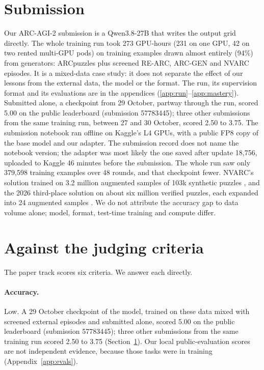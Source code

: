 \documentclass[11pt]{article}
\begin{document}
\section{Submission}
\label{sec:submission}

Our ARC-AGI-2 submission is a Qwen3.8-27B that writes the output grid directly.
The whole training run took 273 GPU-hours (231 on one GPU, 42 on two rented
multi-GPU pods) on training examples drawn almost entirely (94\%) from
generators: ARCpuzzles plus screened RE-ARC, ARC-GEN and NVARC episodes. It is
a mixed-data case study: it does not separate the effect of our lessons from
the external data, the model or the format. The run, its
supervision format and its evaluations are in the appendices
(\ref{app:run}--\ref{app:mastery}). Submitted alone, a checkpoint from 29
October, partway through the run, scored 5.00 on the public leaderboard
(submission 57783445); three other
submissions from the same training run, between 27 and 30 October, scored
2.50 to 3.75. The
submission notebook ran offline on Kaggle's L4 GPUs, with a public FP8 copy of
the base model and our adapter. The submission record does not name the
notebook version; the adapter was most likely the one saved after update 18,756,
uploaded to Kaggle 46 minutes before the submission. The whole run
saw only 379,598 training examples over 48 rounds, and that checkpoint fewer. NVARC's solution trained on 3.2 million augmented samples of
103k synthetic puzzles \cite{nvarc}, and the 2026 third-place solution on
about six million verified puzzles, each expanded into 24 augmented samples
\cite{darragh2026}. We do not attribute the accuracy
gap to data volume alone; model, format, test-time training and compute differ.

\section{Against the judging criteria}
\label{sec:criteria}

The paper track scores six criteria. We answer each directly.

\paragraph{Accuracy.} Low. A 29 October checkpoint of the model, trained on
these data mixed with screened external episodes and submitted alone, scored
5.00 on the public leaderboard (submission 57783445); three other
submissions from the same training run scored 2.50 to 3.75
(Section~\ref{sec:submission}). Our local
public-evaluation scores are not independent evidence, because those tasks were
in training (Appendix~\ref{app:evals}).
\end{document}
